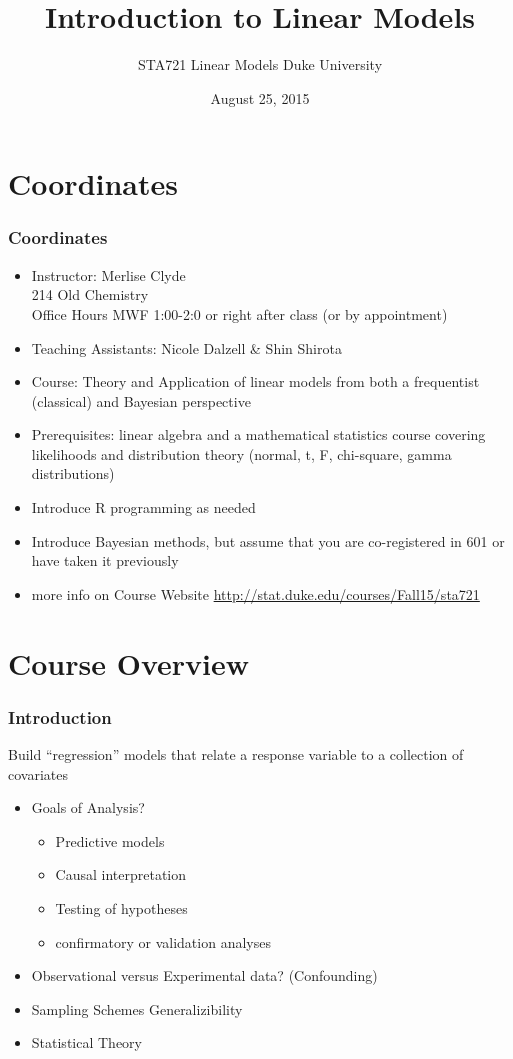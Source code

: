 \documentclass[]{beamer}
\title{Introduction to Linear Models}
\institute{Merlise Clyde}
\author{STA721 Linear Models Duke University \\
}
\date{August 25, 2015}
\begin{document}
\maketitle
\section{Coordinates}
\begin{frame}
  \frametitle{Coordinates}
\begin{itemize}
\item Instructor: Merlise Clyde   \\ 214 Old Chemistry \\
 Office Hours MWF 1:00-2:0 or right after class (or by appointment)
\item Teaching Assistants:  Nicole Dalzell \& Shin Shirota

\item Course: Theory and Application of linear models from both a
frequentist (classical) and Bayesian perspective \pause
\item Prerequisites:   linear algebra and a mathematical statistics
  course covering likelihoods and distribution theory (normal, t, F,
  chi-square, gamma distributions) \pause
\item Introduce  R programming as needed \pause
\item Introduce  Bayesian methods, but assume that you are
  co-registered in 601 or have taken it previously \pause
\item more info on Course Website
  \url{http://stat.duke.edu/courses/Fall15/sta721}
\end{itemize}
  \end{frame}

\section{Course Overview}
\begin{frame}
  \frametitle{Introduction}
  Build ``regression'' models that relate a response variable to a
  collection of covariates  \pause
  \begin{itemize}
  \item Goals of Analysis?  \pause
    \begin{itemize}
    \item Predictive models 
    \item Causal interpretation
    \item Testing of hypotheses
    \item confirmatory  or validation analyses    
    \end{itemize}
 \item Observational versus Experimental data? \pause (Confounding) \pause
 \item Sampling Schemes \pause  Generalizibility \pause
 \item Statistical Theory \pause 
  \end{itemize}
\end{frame}
\end{document}
